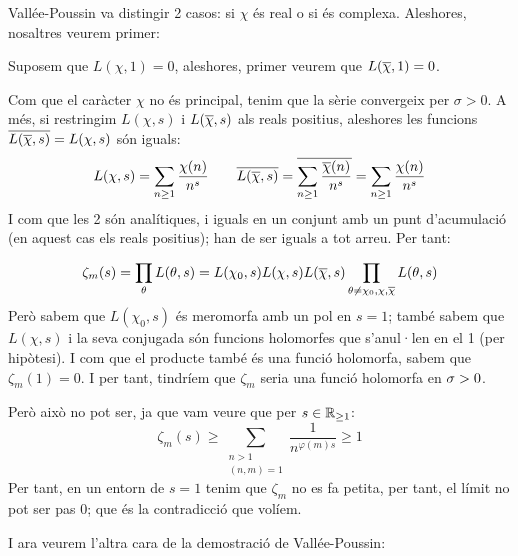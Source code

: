 Vallée-Poussin va distingir 2 casos: si $\chi$ és real o si és complexa. Aleshores, nosaltres veurem primer:
\begin{pf}
    Suposem que $L(\chi,1)=0$, aleshores, primer veurem que $L(\overline\chi,1)=0$.\par
    Com que el caràcter $\chi$ no és principal, tenim que la sèrie convergeix per $\sigma>0$. A més, si restringim $L(\chi,s)$ i $L(\overline\chi, s)$ als reals positius, aleshores les funcions $\overline{L(\overline \chi,s)}=L(\chi,s)$ són iguals:
    \[
        L(\chi,s)=\sum_{n\geq1} \frac{\chi(n)}{n^s} \qquad 
        \overline{L(\overline\chi,s)}=\overline{\sum_{n\geq1}\frac{\overline\chi(n)}{n^s}}=\sum_{n\geq1} \frac{\chi(n)}{n^s}
    \]
    I com que les 2 són analítiques, i iguals en un conjunt amb un punt d'acumulació (en aquest cas els reals positius); han de ser iguals a tot arreu. Per tant:

    \[
    \zeta_m(s)=\prod_{\theta}L(\theta,s)=L(\chi_0,s)L(\chi,s)L(\overline\chi,s)\prod_{\theta\neq \chi_0,\chi,\overline\chi}L(\theta,s)
    \]
    Però sabem que $L(\chi_0,s)$ és meromorfa amb un pol en $s=1$; també sabem que $L(\chi,s)$ i la seva conjugada són funcions holomorfes que s'anul·len en el 1 (per hipòtesi). I com que el producte també és una funció holomorfa, sabem que $\zeta_m(1)=0$. I per tant, tindríem que $\zeta_m$ seria una funció holomorfa en $\sigma>0$.\par
    Però això no pot ser, ja que vam veure que per $s\in\mathbb R_{\geq1}$:
    \[
    \zeta_m(s)\geq \sum_{\substack{n>1\\(n,m)=1}}\frac{1}{n^{\varphi(m)s}}\geq1
    \]
    Per tant, en un entorn de $s=1$ tenim que $\zeta_m$ no es fa petita, per tant, el límit no pot ser pas 0; que és la contradicció que volíem.
\end{pf}
I ara veurem l'altra cara de la demostració de Vallée-Poussin:

